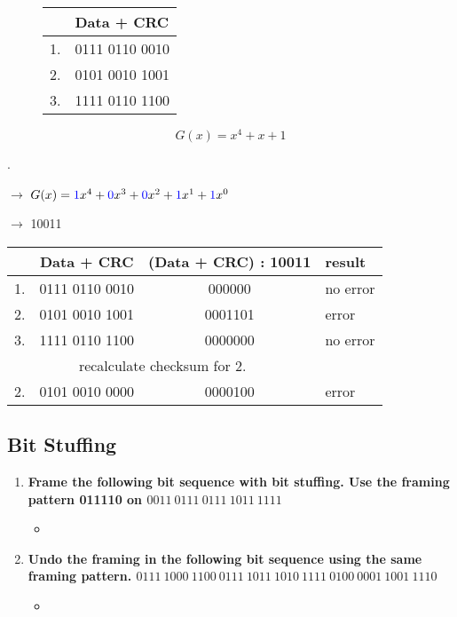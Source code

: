\documentclass[a4paper,12pt]{article}
\begin{document}
	\begin{figure}[h!]
		\begin{minipage}{0.49\linewidth}
			\centering
			\begin{tabular}{c|l}\hline
				~ & Data + CRC \\ \hline
				1. & 0111 0110 0010 \\
				2. & 0101 0010 1001 \\
				3. & 1111 0110 1100 \\ \hline
			\end{tabular}
		\end{minipage}
		\hfill
		\begin{minipage}{0.49\linewidth}
			\begin{equation*}
			G(x) = x^4 + x + 1		
			\end{equation*}
		\end{minipage}	
	\end{figure}.


		$\rightarrow$	$G(x) = \textcolor{blue}{1}x^4 + \textcolor{blue}{0}x^3 + \textcolor{blue}{0}x^2 + \textcolor{blue}{1}x^1 + \textcolor{blue}{1}x^0$

	$\rightarrow$ 10011 
	\begin{table}[h!]
		\begin{tabular}{c|c|c|l}\hline
			~ & Data + CRC & (Data + CRC) : 10011 & result \\ \hline
			1. & 0111 0110 0010 & 000000 & no error \\
			2. & 0101 0010 1001 & 0001101 & error \\
			3. & 1111 0110 1100 & 0000000 & no error\\ \hline
			\multicolumn{3}{2}{recalculate checksum for 2.} \\ \hline
			2. & 0101 0010 0000 & 0000100 & error \\
		\end{tabular}
	\end{table}
	
	
	\subsection{Bit Stuffing}
	\begin{enumerate}[label=(\roman*),itemsep=0pt]
		\item \textbf{Frame the following bit sequence with bit stuffing. Use the framing pattern 011110 on $0011~0111~0111~1011~1111$}
		\begin{itemize}
			\item %
		\end{itemize}
		\item \textbf{Undo the framing in the following bit sequence using the same framing pattern. $0111~1000~ 1100~ 0111~ 1011~ 1010~ 1111~ 0100~ 0001~ 1001~ 1110$}
		\begin{itemize}
			\item %
		\end{itemize}
	\end{enumerate}
\end{document}
